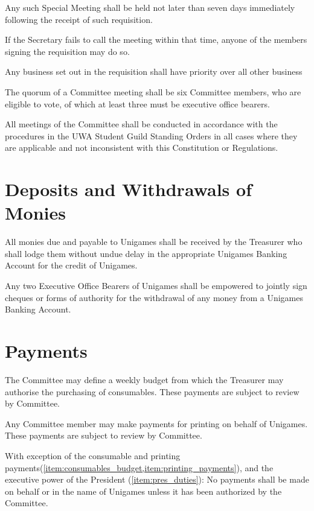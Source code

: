 \documentclass[a4paper]{article}
\begin{document}
\begin{myEnumerate}
        \begin{myEnumerate}
            \item Any such Special Meeting shall be held not later than seven days immediately following the receipt of such requisition.
                \begin{myEnumerate}
                    \item If the Secretary fails to call the meeting within that time, anyone of the members signing the requisition may do so.
                \end{myEnumerate}
            \item Any business set out in the requisition shall have priority over all other business
        \end{myEnumerate}
    \item The quorum of a Committee meeting shall be six Committee members, who are eligible to vote, of which at least three must be executive office bearers.
    \item All meetings of the Committee shall be conducted in accordance with the procedures in the UWA Student Guild Standing Orders in all cases where they are applicable and not inconsistent with this Constitution or Regulations.
\end{myEnumerate}


\section{Deposits and Withdrawals of Monies} \label{sec:monies}
\begin{myEnumerate}
    \item All monies due and payable to Unigames shall be received by the Treasurer who shall lodge them without undue delay in the appropriate Unigames Banking Account for the credit of Unigames.
    \item Any two Executive Office Bearers of Unigames shall be empowered to jointly sign cheques or forms of authority for the withdrawal of any money from a Unigames Banking Account.
\end{myEnumerate}


\section{Payments} \label{sec:payments}
\begin{myEnumerate}
    \item \label{item:consumables_budget}The Committee may define a weekly budget from which the Treasurer may authorise the purchasing of consumables. These payments are subject to review by Committee.
    \item \label{item:printing_payments} Any Committee member may make payments for printing on behalf of Unigames. These payments are subject to review by Committee.
    \item With exception of the consumable and printing payments(\cref{item:consumables_budget,item:printing_payments}), and the executive power of the President (\cref{item:pres_duties}): No payments shall be made on behalf or in the name of Unigames unless it has been authorized by the Committee.
\end{myEnumerate}
\end{document}

